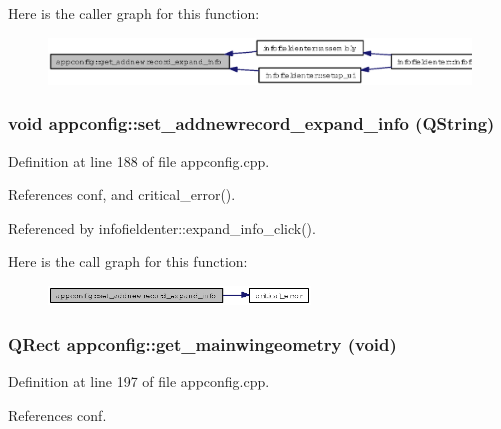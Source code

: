 Here is the caller graph for this function:\begin{figure}[H]
\begin{center}
\leavevmode
\includegraphics[width=326pt]{classappconfig_5e3fa8839799f2622089946d29a359c8_icgraph}
\end{center}
\end{figure}
\subsubsection{\setlength{\rightskip}{0pt plus 5cm}void appconfig::set\_\-addnewrecord\_\-expand\_\-info (QString)}\label{classappconfig_380f3e044a57a554dc2d7980a016a3e2}




Definition at line 188 of file appconfig.cpp.

References conf, and critical\_\-error().

Referenced by infofieldenter::expand\_\-info\_\-click().

Here is the call graph for this function:\begin{figure}[H]
\begin{center}
\leavevmode
\includegraphics[width=197pt]{classappconfig_380f3e044a57a554dc2d7980a016a3e2_cgraph}
\end{center}
\end{figure}
\subsubsection{\setlength{\rightskip}{0pt plus 5cm}QRect appconfig::get\_\-mainwingeometry (void)}\label{classappconfig_266005e28aa275a8df212192d9eaaf27}




Definition at line 197 of file appconfig.cpp.

References conf.

